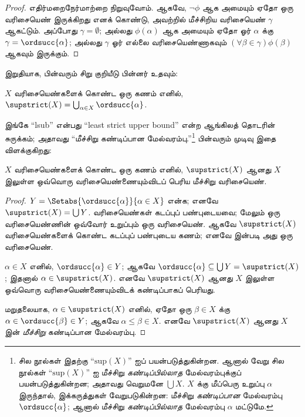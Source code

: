 \documentclass[../../../include/open-logic-section]{subfiles}
\begin{document}
\begin{proof}
எதிர்மறைநேர்மாற்றை நிறுவுவோம். ஆகவே, $\lnot\phi$ ஆக அமையும் ஏதோ ஒரு
வரிசையெண் இருக்கிறது எனக் கொண்டு, அவற்றில் மீச்சிறிய வரிசையெண்
$\gamma$ ஆகட்டும். அப்போது $\gamma = \emptyset$; அல்லது
$\phi(\alpha)$ ஆக அமையும் ஏதோ ஓர் $\alpha$ க்கு
$\gamma = \ordsucc{\alpha}$; அல்லது $\gamma$ ஓர் எல்லை வரிசையெண்ணாகவும்
$(\forall \beta \in \gamma)\phi(\beta)$ ஆகவும் இருக்கும்.
\end{proof}
\noindent
இறுதியாக, பின்வரும் சிறு குறியீடு பின்னர் உதவும்:

\begin{defn}
$X$ வரிசையெண்களைக் கொண்ட ஒரு கணம் எனில், $\supstrict(X) =
\bigcup_{\alpha \in X} \ordsucc{\alpha}$.
\end{defn}
\noindent
இங்கே ``lsub'' என்பது ``least strict upper bound'' என்ற ஆங்கிலத் தொடரின்
சுருக்கம்; அதாவது ``மீச்சிறு கண்டிப்பான மேல்வரம்பு.''\footnote{சில நூல்கள்
இதற்கு ``$\text{sup}(X)$'' ஐப் பயன்படுத்துகின்றன. ஆனால் வேறு சில நூல்கள்
``$\text{sup}(X)$'' ஐ மீச்சிறு \emph{கண்டிப்பில்லாத} மேல்வரம்புக்குப்
பயன்படுத்துகின்றன; அதாவது வெறுமனே $\bigcup X$. $X$ க்கு மீப்பெரு உறுப்பு
$\alpha$ இருந்தால், இக்கருத்துகள் வேறுபடுகின்றன: மீச்சிறு \emph{கண்டிப்பான}
மேல்வரம்பு $\ordsucc{\alpha}$; ஆனால் மீச்சிறு \emph{கண்டிப்பில்லாத}
மேல்வரம்பு $\alpha$ மட்டுமே.} பின்வரும் முடிவு இதை விளக்குகிறது:

\begin{prop}
$X$ வரிசையெண்களைக் கொண்ட ஒரு கணம் எனில், $\supstrict(X)$ ஆனது $X$
இலுள்ள ஒவ்வொரு வரிசையெண்ணையும்விடப் பெரிய மீச்சிறு வரிசையெண்.
\end{prop}

\begin{proof}
$Y = \Setabs{\ordsucc{\alpha}}{\alpha \in X}$ என்க; எனவே
$\supstrict(X) = \bigcup Y$. வரிசையெண்கள் கடப்புப் பண்புடையவை; மேலும்
ஒரு வரிசையெண்ணின் ஒவ்வோர் உறுப்பும் ஒரு வரிசையெண். ஆகவே
$\supstrict(X)$ வரிசையெண்களைக் கொண்ட கடப்புப் பண்புடைய கணம்; எனவே
 இன்படி அது ஒரு வரிசையெண்.

$\alpha \in X$ எனில், $\ordsucc{\alpha} \in Y$; ஆகவே
$\ordsucc{\alpha} \subseteq \bigcup Y = \supstrict(X)$; இதனால்
$\alpha \in \supstrict(X)$. எனவே $\supstrict(X)$ ஆனது $X$ இலுள்ள
ஒவ்வொரு வரிசையெண்ணையும்விடக் கண்டிப்பாகப் பெரியது.

மறுதலையாக, $\alpha \in \supstrict(X)$ எனில், ஏதோ ஒரு $\beta \in X$
க்கு $\alpha \in \ordsucc{\beta} \in Y$; ஆகவே $\alpha \leq
\beta \in X$. எனவே $\supstrict(X)$ ஆனது $X$ இன் \emph{மீச்சிறு}
கண்டிப்பான மேல்வரம்பு.
\end{proof}
\end{document}
